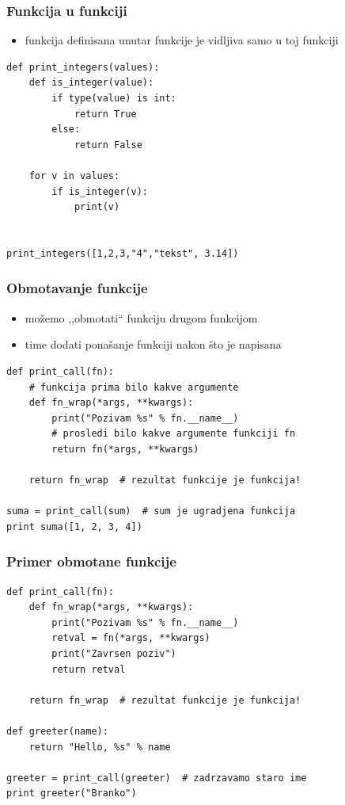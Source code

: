 \documentclass[compress]{beamer}
\begin{document}
\begin{frame}[fragile]
  \frametitle{Funkcija u funkciji}
  \begin{itemize}
    \item funkcija definisana unutar funkcije je vidljiva samo u toj funkciji
  \end{itemize}
\begin{verbatim}
def print_integers(values):
    def is_integer(value):
        if type(value) is int:
            return True
        else:
            return False

    for v in values:
        if is_integer(v):
            print(v)


print_integers([1,2,3,"4","tekst", 3.14])
\end{verbatim}
\end{frame}

\begin{frame}[fragile]
  \frametitle{Obmotavanje funkcije}
  \begin{itemize}
    \item možemo ,,obmotati`` funkciju drugom funkcijom
    \item time dodati ponašanje funkciji nakon što je napisana
  \end{itemize}
\begin{verbatim}
def print_call(fn):
    # funkcija prima bilo kakve argumente
    def fn_wrap(*args, **kwargs):
        print("Pozivam %s" % fn.__name__)
        # prosledi bilo kakve argumente funkciji fn
        return fn(*args, **kwargs) 
    
    return fn_wrap  # rezultat funkcije je funkcija!

suma = print_call(sum)  # sum je ugradjena funkcija
print suma([1, 2, 3, 4])
\end{verbatim}
\end{frame}

\begin{frame}[fragile]
  \frametitle{Primer obmotane funkcije}
\begin{verbatim}
def print_call(fn):
    def fn_wrap(*args, **kwargs):
        print("Pozivam %s" % fn.__name__)
        retval = fn(*args, **kwargs) 
        print("Zavrsen poziv")
        return retval
    
    return fn_wrap  # rezultat funkcije je funkcija!

def greeter(name):
    return "Hello, %s" % name

greeter = print_call(greeter)  # zadrzavamo staro ime
print greeter("Branko")
\end{verbatim}
\end{frame}
\end{document}
